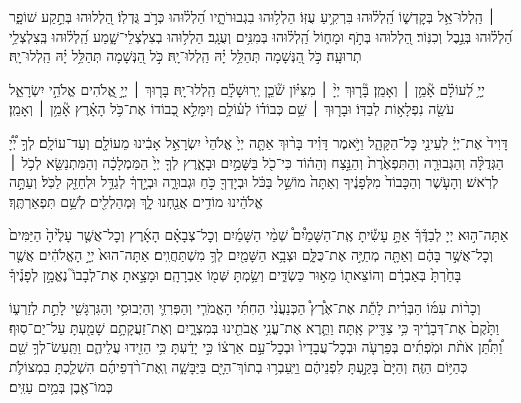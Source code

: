 \documentclass[twoside, openany, parskip=half, 11pt]{book}
\begin{document}
 ׀
הַֽלְלוּ־אֵ֥ל בְּקׇדְשׁ֑וֹ הַֽ֝לְל֗וּהוּ בִּרְקִ֥יעַ עֻזּֽוֹ׃
הַלְל֥וּהוּ בִגְבוּרֹתָ֑יו הַ֝לְל֗וּהוּ כְּרֹ֣ב גֻּדְלֽוֹ׃
הַ֭לְלוּהוּ בְּתֵ֣קַע שׁוֹפָ֑ר הַ֝לְל֗וּהוּ בְּנֵ֣בֶל וְכִנּֽוֹר׃
הַ֭לְלוּהוּ בְּתֹ֣ף וּמָח֑וֹל הַֽ֝לְל֗וּהוּ בְּמִנִּ֥ים וְעֻגָֽב׃
הַלְל֥וּהוּ בְצִלְצְלֵי־שָׁ֑מַע הַֽ֝לְל֗וּהוּ בְּֽצִלְצְלֵ֥י תְרוּעָֽה׃
כֹּ֣ל הַ֭נְּשָׁמָה תְּהַלֵּ֥ל יָ֗הּ הַֽלְלוּ־יָֽהּ׃
\scriptsize{כֹּ֣ל הַ֭נְּשָׁמָה תְּהַלֵּ֥ל יָ֗הּ הַֽלְלוּ־יָֽהּ׃ \\}
\normalsize{}

\negline

יְיָ֥ לְ֝עוֹלָ֗ם אָ֘מֵ֥ן ׀ וְאָמֵֽן׃ \hfill \break
{}בָּ֘ר֤וּךְ יְיָ֨ ׀ מִצִּיּ֗וֹן שֹׁ֘כֵ֤ן יְֽרוּשָׁלָ֗‍ִם הַֽלְלוּ־יָֽהּ׃ \hfill \break
{}בָּר֤וּךְ ׀ יְיָ֣ אֱ֭לֹהִים אֱלֹהֵ֣י יִשְׂרָאֵ֑ל עֹשֵׂ֖ה נִפְלָא֣וֹת לְבַדּֽוֹ׃ וּבָר֤וּךְ ׀ שֵׁ֥ם כְּבוֹד֗וֹ לְע֫וֹלָ֥ם וְיִמָּלֵ֣א כְ֭בוֹדוֹ אֶת־כֹּ֥ל הָאָ֗רֶץ אָ֘מֵ֥ן ׀ וְאָמֵֽן׃





דָּוִיד֙ אֶת־יְיָ֔ לְעֵינֵ֖י כׇּל־הַקָּהָ֑ל וַיֹּ֣אמֶר דָּוִ֗יד בָּר֨וּךְ אַתָּ֤ה יְיָ֙ אֱלֹהֵי֙ יִשְׂרָאֵ֣ל אָבִ֔ינוּ מֵעוֹלָ֖ם וְעַד־עוֹלָֽם׃
לְךָ֣ יְ֠יָ֠ הַגְּדֻלָּ֨ה וְהַגְּבוּרָ֤ה וְהַתִּפְאֶ֙רֶת֙ וְהַנֵּ֣צַח וְהַה֔וֹד כִּי־כֹ֖ל בַּשָּׁמַ֣יִם וּבָאָ֑רֶץ לְךָ֤ יְיָ֙ הַמַּמְלָכָ֔ה וְהַמִּתְנַשֵּׂ֖א לְכֹ֥ל ׀ לְרֹֽאשׁ׃
וְהָעֹ֤שֶׁר וְהַכָּבוֹד֙ מִלְּפָנֶ֔יךָ וְאַתָּה֙ מוֹשֵׁ֣ל בַּכֹּ֔ל וּבְיָדְךָ֖ כֹּ֣חַ וּגְבוּרָ֑ה וּבְיָ֣דְךָ֔ לְגַדֵּ֥ל וּלְחַזֵּ֖ק לַכֹּֽל׃
וְעַתָּ֣ה אֱלֹהֵ֔ינוּ מוֹדִ֥ים אֲנַ֖חְנוּ לָ֑ךְ וּֽמְהַלְלִ֖ים לְשֵׁ֥ם תִּפְאַרְתֶּֽךָ׃





אַתָּה־ה֣וּא
יְיָ לְבַדֶּ֒ךָ֒ אַתָּ֣ עָשִׂ֡יתָ אֶֽת־הַשָּׁמַ֩יִם֩ שְׁמֵ֨י הַשָּׁמַ֜יִם וְכׇל־צְבָאָ֗ם הָאָ֜רֶץ וְכׇל־אֲשֶׁ֤ר עָלֶ֙יהָ֙ הַיַּמִּים֙ וְכׇל־אֲשֶׁ֣ר בָּהֶ֔ם וְאַתָּ֖ה מְחַיֶּ֣ה אֶת־כֻּלָּ֑ם וּצְבָ֥א הַשָּׁמַ֖יִם לְךָ֥ מִשְׁתַּחֲוִֽים׃
אַתָּה־הוּא֙ יְיָ֣ הָאֱלֹהִ֔ים אֲשֶׁ֤ר בָּחַ֙רְתָּ֙ בְּאַבְרָ֔ם וְהוֹצֵאת֖וֹ מֵא֣וּר כַּשְׂדִּ֑ים וְשַׂ֥מְתָּ שְּׁמ֖וֹ אַבְרָהָֽם׃ וּמָצָ֣אתָ אֶת־לְבָבוֹ֮ נֶאֱמָ֣ן לְפָנֶ֒יךָ֒

וְכָר֨וֹת עִמּ֜וֹ הַבְּרִ֗ית לָתֵ֡ת אֶת־אֶ֩רֶץ֩ הַכְּנַעֲנִ֨י הַחִתִּ֜י הָאֱמֹרִ֧י וְהַפְּרִזִּ֛י וְהַיְבוּסִ֥י וְהַגִּרְגָּשִׁ֖י לָתֵ֣ת לְזַרְע֑וֹ וַתָּ֙קֶם֙ אֶת־דְּבָרֶ֔יךָ כִּ֥י צַדִּ֖יק אָֽתָּה׃ וַתֵּ֛רֶא אֶת־עֳנִ֥י אֲבֹתֵ֖ינוּ בְּמִצְרָ֑יִם וְאֶת־זַעֲקָתָ֥ם שָׁמַ֖עְתָּ עַל־יַם־סֽוּף׃ וַ֠תִּתֵּ֠ן אֹתֹ֨ת וּמֹֽפְתִ֜ים בְּפַרְעֹ֤ה וּבְכׇל־עֲבָדָיו֙ וּבְכׇל־עַ֣ם אַרְצ֔וֹ כִּ֣י יָדַ֔עְתָּ כִּ֥י הֵזִ֖ידוּ עֲלֵיהֶ֑ם וַתַּֽעַשׂ־לְךָ֥ שֵׁ֖ם כְּהַיּ֥וֹם הַזֶּֽה׃
וְהַיָּם֙ בָּקַ֣עְתָּ לִפְנֵיהֶ֔ם וַיַּֽעַבְר֥וּ בְתוֹךְ־הַיָּ֖ם בַּיַּבָּשָׁ֑ה וְֽאֶת־רֹ֨דְפֵיהֶ֜ם הִשְׁלַ֧כְתָּ בִמְצוֹלֹ֛ת כְּמוֹ־אֶ֖בֶן בְּמַ֥יִם עַזִּֽים׃
\end{document}
